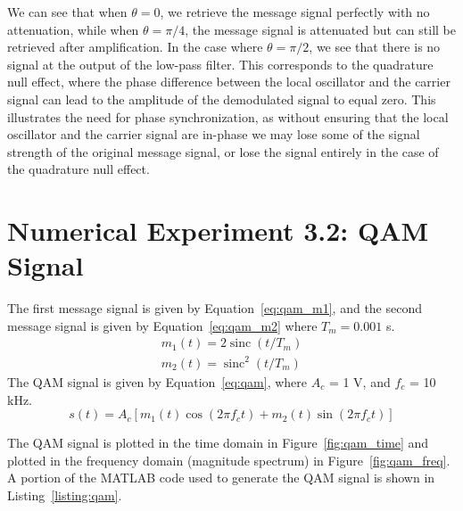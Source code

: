 \documentclass[12pt]{article}
\DeclareMathOperator{\sinc}{sinc}
\begin{document}
We can see that when $\theta = 0$, we retrieve the message signal perfectly with no attenuation, while when $\theta = \pi/4$, the message signal is attenuated but can still be retrieved after amplification. In the case where $\theta = \pi/2$, we see that there is no signal at the output of the low-pass filter. This corresponds to the quadrature null effect, where the phase difference between the local oscillator and the carrier signal can lead to the amplitude of the demodulated signal to equal zero. This illustrates the need for phase synchronization, as without ensuring that the local oscillator and the carrier signal are in-phase we may lose some of the signal strength of the original message signal, or lose the signal entirely in the case of the quadrature null effect.

\section*{Numerical Experiment 3.2: QAM Signal}
The first message signal is given by Equation~\ref{eq:qam_m1}, and the second message signal is given by Equation~\ref{eq:qam_m2} where $T_m = 0.001$ s.
\begin{gather}
    m_1(t) = 2 \sinc{\left(t / T_m\right)} \label{eq:qam_m1} \\
    m_2(t) = \sinc^2{\left(t / T_m\right)} \label{eq:qam_m2}
\end{gather}
The QAM signal is given by Equation~\ref{eq:qam}, where $A_c$ = 1 V, and $f_c$ = 10 kHz.
\begin{equation} \label{eq:qam}
    s(t) = A_c \left[ m_1(t) \cos(2 \pi f_c t) + m_2(t) \sin(2 \pi f_c t) \right]    
\end{equation}

The QAM signal is plotted in the time domain in Figure~\ref{fig:qam_time} and plotted in the frequency domain (magnitude spectrum) in Figure~\ref{fig:qam_freq}. A portion of the MATLAB code used to generate the QAM signal is shown in Listing~\ref{listing:qam}.


\end{document}
